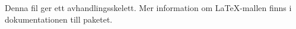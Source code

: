 Denna fil ger ett avhandlingsskelett. Mer information om \LaTeX-mallen finns i dokumentationen till paketet.
